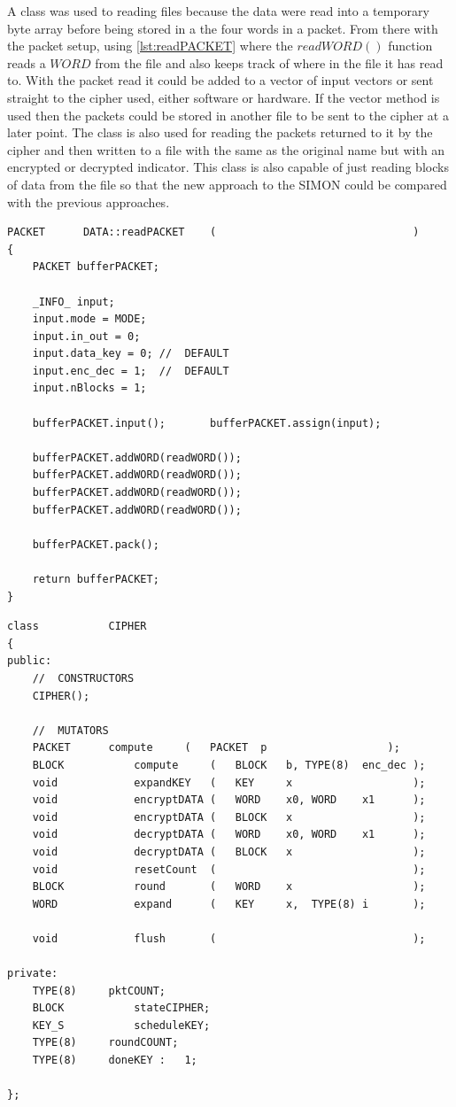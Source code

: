 \documentclass[12pt,twoside,a4paper]{report}
\begin{document}
   	A class was used to reading files because the data were read into a temporary byte array before being stored in a the four words in a packet. From there with the packet setup, using \autoref{lst:readPACKET} where the $readWORD()$ function reads a $WORD$ from the file and also keeps track of where in the file it has read to. With the packet read it could be added to a vector of input vectors or sent straight to the cipher used, either software or hardware. If the vector method is used then the packets could be stored in another file to be sent to the cipher at a later point. The class is also used for reading the packets returned to it by the cipher and then written to a file with the same as the original name but with an encrypted or decrypted indicator. This class is also capable of just reading blocks of data from the file so that the new approach to the SIMON could be compared with the previous approaches.

 	\begin{minipage}{\linewidth}
	\begin{lstlisting}[label={lst:readPACKET},caption={Function used for reading a packet},style=CStyle]	
PACKET		DATA::readPACKET	(								)
{
	PACKET bufferPACKET;
	
	_INFO_ input;
	input.mode = MODE;
	input.in_out = 0;
	input.data_key = 0;	//	DEFAULT
	input.enc_dec = 1;	//	DEFAULT
	input.nBlocks = 1;
	
	bufferPACKET.input();		bufferPACKET.assign(input);
	
	bufferPACKET.addWORD(readWORD());
	bufferPACKET.addWORD(readWORD());
	bufferPACKET.addWORD(readWORD());
	bufferPACKET.addWORD(readWORD());
	
	bufferPACKET.pack();
	
	return bufferPACKET;
}
	\end{lstlisting}
	\end{minipage}
	
 	\begin{minipage}{\linewidth}
	\begin{lstlisting}[label={lst:CIPHER_CLASS},caption={The declaration of the CIPHER Class},style=CStyle]	   	
class			CIPHER
{
public:
	//	CONSTRUCTORS
	CIPHER();
	
	//	MUTATORS
	PACKET		compute		(	PACKET	p					);
	BLOCK			compute		(	BLOCK	b, TYPE(8)	enc_dec	);
	void			expandKEY	(	KEY		x					);
	void			encryptDATA	(	WORD	x0,	WORD	x1		);
	void			encryptDATA	(	BLOCK	x					);
	void			decryptDATA	(	WORD	x0,	WORD	x1		);
	void			decryptDATA	(	BLOCK	x					);
	void			resetCount	(								);
	BLOCK			round		(	WORD	x					);
	WORD			expand		(	KEY		x,	TYPE(8)	i		);
	
	void			flush		(								);
	
private:
	TYPE(8)		pktCOUNT;
	BLOCK			stateCIPHER;
	KEY_S			scheduleKEY;
	TYPE(8)		roundCOUNT;
	TYPE(8)		doneKEY	:	1;
	
};
	\end{lstlisting}
	\end{minipage}
   	
\end{document}
